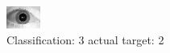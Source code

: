 \begin{figure}[h!]
\begin{center}
\includegraphics[width=0.60\columnwidth]{figures/ID1731_class_3_target_2.png}
\end{center}
\caption{ Classification: 3 actual target: 2}
\label{fig:ID1731_class_3_target_2}
\end{figure}
